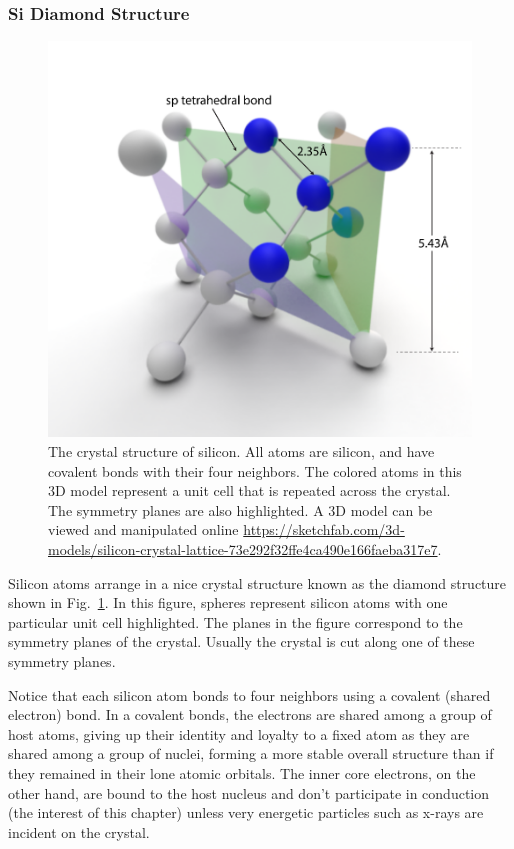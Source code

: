 \subsubsection{Si Diamond Structure}
\begin{figure}
\centering
\includegraphics[width=.75\columnwidth]{silicon_crysal_label.pdf}
\caption{The crystal structure of silicon.  All atoms are silicon, and have covalent bonds with their four neighbors.  The colored atoms in this 3D model represent a unit cell that is repeated across the crystal.  The symmetry planes are also highlighted.  A 3D model can be viewed and manipulated online \url{https://sketchfab.com/3d-models/silicon-crystal-lattice-73e292f32ffe4ca490e166faeba317e7}.} \label{fig:silicon_crysal}
\end{figure}
Silicon atoms arrange in a nice crystal structure known as the diamond structure shown in Fig.~\ref{fig:silicon_crysal}.  In this figure, spheres represent silicon atoms with one particular unit cell highlighted.  The planes in the figure correspond to the symmetry planes of the crystal.  Usually the crystal is cut along one of these symmetry planes.

Notice that each silicon atom bonds to four neighbors using a covalent (shared electron) bond.  In a covalent bonds, the electrons are shared among a group of host atoms, giving up their identity and loyalty to a fixed atom as they are shared among a group of nuclei, forming a more stable overall structure than if they remained in their lone atomic orbitals.  The inner core electrons, on the other hand, are bound to the host nucleus and don't participate in conduction (the interest of this chapter) unless very energetic particles such as x-rays are incident on the crystal. 
